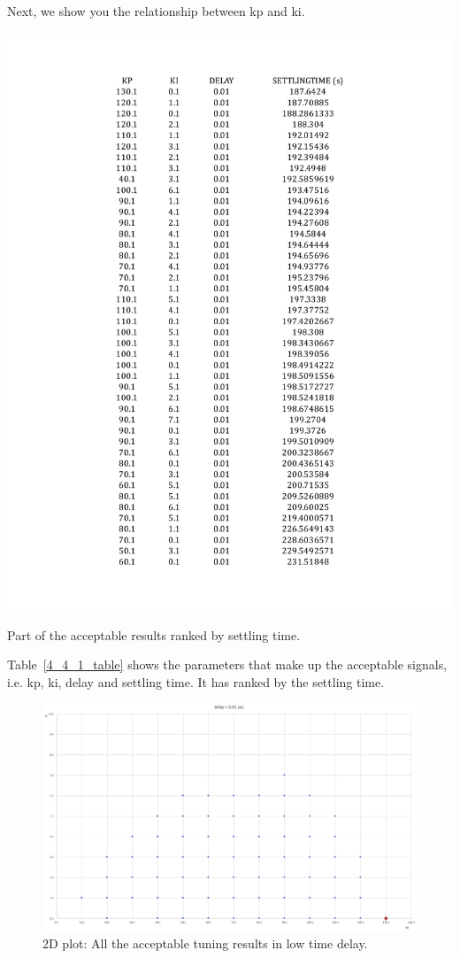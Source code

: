 Next, we show you the relationship between kp and ki. 

\begin{table}[htbp]
\centering
\includegraphics[width = \textwidth]{figure/4_4_1_table.pdf}
\caption{Part of the acceptable results ranked by settling time.}
\label{4_4_1_table}
\end{table}

 Table~\ref{4_4_1_table} shows the parameters that make up the acceptable signals, i.e. kp, ki, delay and settling time. It has ranked by the settling time.  

\begin{figure}[htbp]
\centering
\includegraphics[width = .819\textwidth]{figure/4_4_1_2d.png}
\caption{2D plot: All the acceptable tuning results in low time delay.}
\label{4_4_1_2d}
\end{figure}

